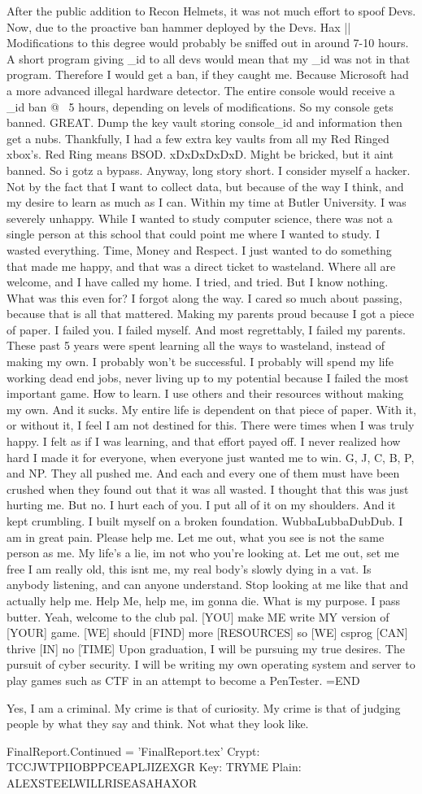 After the public addition to Recon Helmets, it was not much effort to spoof Devs.
Now, due to the proactive ban hammer deployed by the Devs. Hax || Modifications to this degree
would probably be sniffed out in around 7-10 hours. A short program giving _id to all devs
would mean that my _id was not in that program. Therefore I would get a ban, if they caught me.
Because Microsoft had a more advanced illegal hardware detector. The entire console would receive
a _id ban @ ~5 hours, depending on levels of modifications. 
So my console gets banned. GREAT. Dump the key vault storing console_id and information
then get a nubs. Thankfully, I had a few extra key vaults from all my Red Ringed xbox's.
Red Ring means BSOD. xDxDxDxDxD. Might be bricked, but it aint banned. So i gotz a bypass.
Anyway, long story short. I consider myself a hacker. Not by the fact that I want to collect data,
but because of the way I think, and my desire to learn as much as I can. 
Within my time at Butler University. I was severely unhappy. While I wanted to study computer science,
there was not a single person at this school that could point me where I wanted to study.
I wasted everything. Time, Money and Respect. I just wanted to do something that made me happy,
and that was a direct ticket to wasteland. Where all are welcome, and I have called my home. 
I tried, and tried. But I know nothing. What was this even for? I forgot along the way. 
I cared so much about passing, because that is all that mattered. Making my parents proud because
I got a piece of paper. I failed you. I failed myself. And most regrettably, I failed my parents.
These past 5 years were spent learning all the ways to wasteland, instead of making my own.
I probably won't be successful. I probably will spend my life working dead end jobs, never
living up to my potential because I failed the most important game. How to learn.
I use others and their resources without making my own. And it sucks. My entire life
is dependent on that piece of paper. With it, or without it, I feel I am not destined for this.
There were times when I was truly happy. I felt as if I was learning, and that effort payed off.
I never realized how hard I made it for everyone, when everyone just wanted me to win.
G, J, C, B, P, and NP. They all pushed me. And each and every one of them must have been crushed when they
found out that it was all wasted. I thought that this was just hurting me. But no. I hurt each of you.
I put all of it on my shoulders. And it kept crumbling. I built myself on a broken foundation.
WubbaLubbaDubDub. I am in great pain. Please help me. Let me out, what you see is not the 
same person as me. My life's a lie, im not who you're looking at. Let me out, set me free
I am really old, this isnt me, my real body's slowly dying in a vat. Is anybody listening,
and can anyone understand. Stop looking at me like that and actually help me.
Help Me, help me, im gonna die. What is my purpose. I pass butter. Yeah, welcome to the club pal.
[YOU] make {ME} write {MY} version of [YOUR] game.
[WE] should [FIND] more [RESOURCES] so [WE] csprog [CAN] thrive [IN] no [TIME]
Upon graduation, I will be pursuing my true desires. The pursuit of cyber security.
I will be writing my own operating system and server to play games such as CTF
in an attempt to become a PenTester. 
=END

Yes, I am a criminal. My crime is that of curiosity. 
My crime is that of judging people by what they say and think. 
Not what they look like.

FinalReport.Continued = 'FinalReport.tex'
Crypt: TCCJWTPIIOBPPCEAPLJIZEXGR 
Key: TRYME
Plain: ALEXSTEELWILLRISEASAHAXOR
